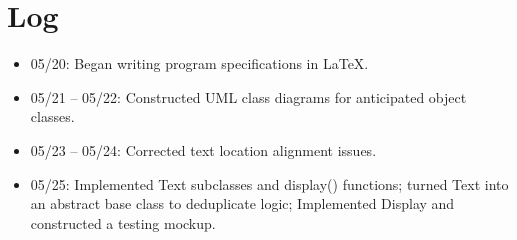 \documentclass{article}
\begin{document}
\section{Log}
\begin{itemize}
    \item 05/20: Began writing program specifications in \LaTeX.
    \item 05/21 -- 05/22: Constructed UML class diagrams for anticipated object classes.
    \item 05/23 -- 05/24: Corrected text location alignment issues.
    \item 05/25: Implemented Text subclasses and display() functions; turned Text into an abstract base class to deduplicate logic; Implemented Display and constructed a testing mockup.
\end{itemize}
\end{document}
